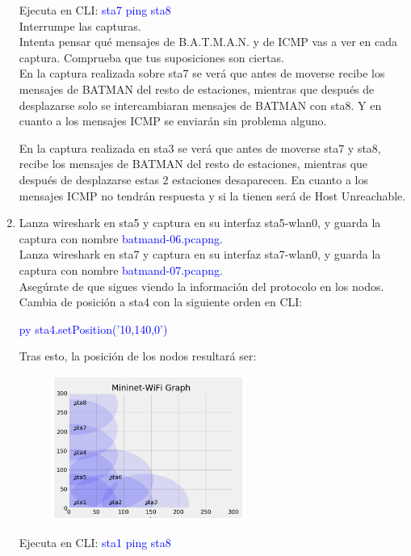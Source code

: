 \documentclass[12pt, a4paper]{report}
\begin{document}
\begin{enumerate}
	Ejecuta en CLI: \textcolor{blue}{sta7 ping sta8}\\
	
	Interrumpe las capturas.\\
	
	Intenta pensar qué mensajes de B.A.T.M.A.N. y de ICMP vas a ver en cada captura. Comprueba
	que tus suposiciones son ciertas.\\
	
	En la captura realizada sobre sta7 se verá que antes de moverse recibe los mensajes de BATMAN del resto de estaciones, mientras que después de desplazarse solo se intercambiaran mensajes de BATMAN con sta8. Y en cuanto a los mensajes ICMP se enviarán sin problema alguno.
	
	En la captura realizada en sta3 se verá que antes de moverse sta7 y sta8, recibe los mensajes de BATMAN del resto de estaciones, mientras que después de desplazarse estas 2 estaciones desaparecen. En cuanto a los mensajes ICMP no tendrán respuesta y si la tienen será de Host Unreachable.
	\item Lanza wireshark en sta5 y captura en su interfaz sta5-wlan0, y guarda la captura con nombre
	\textcolor{blue}{batmand-06.pcapng}.\\
	
	Lanza wireshark en sta7 y captura en su interfaz sta7-wlan0, y guarda la captura con nombre
	\textcolor{blue}{batmand-07.pcapng}.\\
	
	Asegúrate de que sigues viendo la información del protocolo en los nodos.\\
	
	Cambia de posición a sta4 con la siguiente orden en CLI:
	\begin{center}
		\textcolor{blue}{py sta4.setPosition('10,140,0')}
	\end{center}
	Tras esto, la posición de los nodos resultará ser:
	\begin{figure}[H]
		\centering
		\includegraphics[width=0.6\textwidth]{enunciado6}
	\end{figure}
	Ejecuta en CLI: \textcolor{blue}{sta1 ping sta8}\\
	

\end{enumerate}
\end{document}
